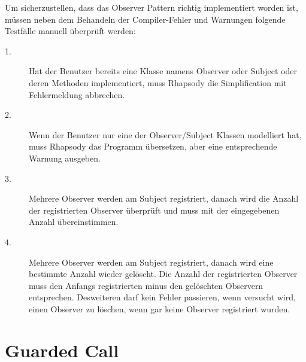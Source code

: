 Um sicherzustellen, dass das Observer Pattern richtig implementiert worden ist, müssen neben dem Behandeln der Compiler-Fehler und Warnungen folgende Testfälle manuell überprüft werden: 

\begin{description}

	\item[1.]
	Hat der Benutzer bereits eine Klasse namens Observer oder Subject oder deren Methoden implementiert, muss Rhapsody die Simplification mit Fehlermeldung abbrechen.
	
	\item[2.]
	Wenn der Benutzer nur eine der Observer/Subject Klassen modelliert hat, muss Rhapsody das Programm übersetzen, aber eine entsprechende Warnung ausgeben.
	
	\item[3.]
	Mehrere Observer werden am Subject registriert, danach wird die Anzahl der registrierten Observer überprüft und muss mit der eingegebenen Anzahl übereinstimmen.

	\item[4.]
	Mehrere Observer werden am Subject registriert, danach wird eine bestimmte Anzahl wieder gelöscht. Die Anzahl der registrierten Observer muss den Anfangs registrierten minus den gelöschten Observern entsprechen. Desweiteren darf kein Fehler passieren, wenn versucht wird, einen Observer zu löschen, wenn gar keine Observer registriert wurden.

\end{description}


\section{Guarded Call}

